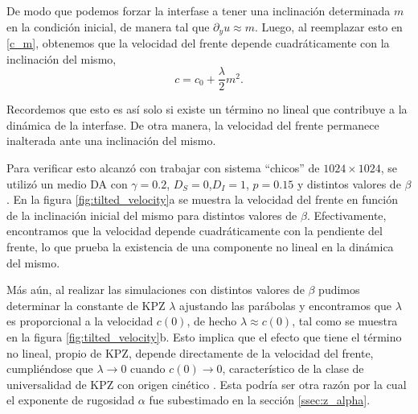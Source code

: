 De modo que podemos forzar la interfase a tener una inclinación determinada $m$ en la condición inicial, de manera tal que $\partial_y u \approx m$. Luego, al reemplazar esto en \ref{c_m}, obtenemos que la velocidad del frente depende cuadráticamente con la inclinación del mismo,
\begin{equation}
    c = c_0 + \frac{\lambda}{2} m^2.
\end{equation}

Recordemos que esto es así solo si existe un término no lineal que contribuye a la dinámica de la interfase. De otra manera, la velocidad del frente permanece inalterada ante una inclinación del mismo.

Para verificar esto alcanzó con trabajar con sistema ``chicos'' de $1024\times1024$, se utilizó un medio DA con $\gamma = 0.2$, $D_S = 0$,$D_I=1$, $p=0.15$ y distintos valores de $\beta$. En la figura \ref{fig:tilted_velocity}a se muestra la velocidad del frente en función de la inclinación inicial del mismo para distintos valores de $\beta$. Efectivamente, encontramos que la velocidad depende cuadráticamente con la pendiente del frente, lo que prueba la existencia de una componente no lineal en la dinámica del mismo.

Más aún, al realizar las simulaciones con distintos valores de $\beta$ pudimos determinar la constante de KPZ $\lambda$ ajustando las parábolas y encontramos que $\lambda$ es proporcional a la velocidad $c(0)$, de hecho $\lambda \approx c(0)$, tal como se muestra en la figura \ref{fig:tilted_velocity}b. Esto implica que el efecto que tiene el término no lineal, propio de KPZ, depende directamente de la velocidad del frente, cumpliéndose que $\lambda\to0$ cuando $c(0)\to0$, característico de la clase de universalidad de KPZ con origen cinético \cite{barabasi}. Esta podría ser otra razón por la cual el exponente de rugosidad $\alpha$ fue subestimado en la sección \ref{ssec:z_alpha}. 


